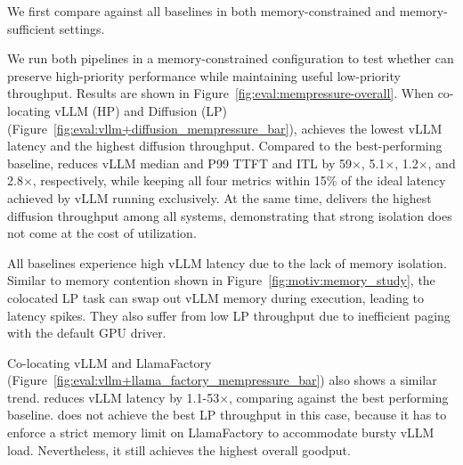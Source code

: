 \label{sec:eval:e2e}

We first compare \tool against all baselines in both memory-constrained and memory-sufficient settings.


We run both pipelines in a memory-constrained configuration to test whether \tool can preserve high-priority performance while maintaining useful low-priority throughput.
Results are shown in Figure~\ref{fig:eval:mempressure-overall}.
When co-locating vLLM (HP) and Diffusion (LP) (Figure~\ref{fig:eval:vllm+diffusion_mempressure_bar}), \tool achieves the lowest vLLM latency and the highest diffusion throughput.
Compared to the best-performing baseline, \tool reduces vLLM median and P99 TTFT and ITL by 59$\times$, 5.1$\times$, 1.2$\times$, and 2.8$\times$, 
respectively, while keeping all four metrics within 15\% of the ideal latency achieved by vLLM running exclusively. At the same time, \tool delivers the highest diffusion throughput among all systems, demonstrating that strong isolation does not come at the cost of utilization.

All baselines experience high vLLM latency due to the lack of memory isolation. Similar to memory contention shown in Figure~\ref{fig:motiv:memory_study}, the colocated LP task can swap out vLLM memory during execution, leading to latency spikes. They also suffer from low LP throughput due to inefficient paging with the default GPU driver.

Co-locating vLLM and LlamaFactory (Figure~\ref{fig:eval:vllm+llama_factory_mempressure_bar}) also shows a similar trend. \tool reduces vLLM latency by 1.1-53$\times$, comparing against the best performing baseline.
\tool does not achieve the best LP throughput in this case, because it has to enforce a strict memory limit on LlamaFactory to accommodate bursty vLLM load.
Nevertheless, it still achieves the highest overall goodput.

